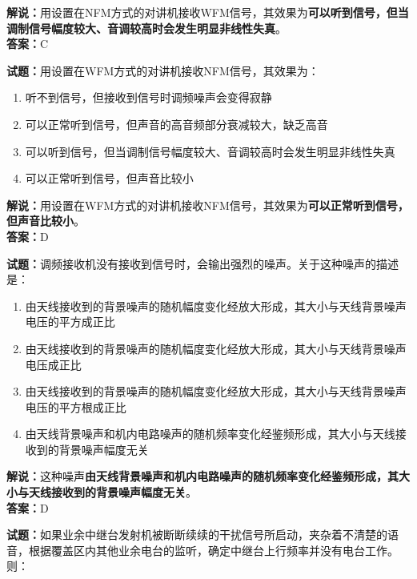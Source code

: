 \documentclass{ctexbook}
\begin{document}
\noindent\textbf{解说：}用设置在NFM方式的对讲机接收WFM信号，其效果为\textbf{可以听到信号，但当调制信号幅度较大、音调较高时会发生明显非线性失真}。\\\noindent\textbf{答案：}C

\vspace{\baselineskip}

\noindent\textbf{试题：}用设置在WFM方式的对讲机接收NFM信号，其效果为：

\begin{enumerate}[leftmargin=3em]
  \item 听不到信号，但接收到信号时调频噪声会变得寂静
  \item 可以正常听到信号，但声音的高音频部分衰减较大，缺乏高音
  \item 可以听到信号，但当调制信号幅度较大、音调较高时会发生明显非线性失真
  \item 可以正常听到信号，但声音比较小
\end{enumerate}

\noindent\textbf{解说：}用设置在WFM方式的对讲机接收NFM信号，其效果为\textbf{可以正常听到信号，但声音比较小}。\\\noindent\textbf{答案：}D

\vspace{\baselineskip}

\noindent\textbf{试题：}调频接收机没有接收到信号时，会输出强烈的噪声。关于这种噪声的描述是：

\begin{enumerate}[leftmargin=3em]
  \item 由天线接收到的背景噪声的随机幅度变化经放大形成，其大小与天线背景噪声电压的平方成正比
  \item 由天线接收到的背景噪声的随机幅度变化经放大形成，其大小与天线背景噪声电压成正比
  \item 由天线接收到的背景噪声的随机幅度变化经放大形成，其大小与天线背景噪声电压的平方根成正比
  \item 由天线背景噪声和机内电路噪声的随机频率变化经鉴频形成，其大小与天线接收到的背景噪声幅度无关
\end{enumerate}

\noindent\textbf{解说：}这种噪声\textbf{由天线背景噪声和机内电路噪声的随机频率变化经鉴频形成，其大小与天线接收到的背景噪声幅度无关}。\\\noindent\textbf{答案：}D%

\vspace{\baselineskip}

\noindent\textbf{试题：}如果业余中继台发射机被断断续续的干扰信号所启动，夹杂着不清楚的语音，根据覆盖区内其他业余电台的监听，确定中继台上行频率并没有电台工作。则：
\end{document}
